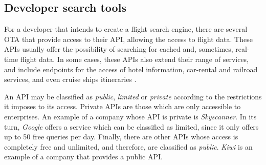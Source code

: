 \subsection{Developer search tools}
\label{sec:developer_st}


For a developer that intends to create a flight search engine, there are several OTA that provide access to their API, allowing the access to flight data. These APIs usually offer the possibility of searching for cached and, sometimes, real-time flight data. In some cases, these APIs also extend their range of services, and include endpoints for the access of hotel information, car-rental and railroad services, and even cruise ships itineraries  \cite{expedia_docs, amadeus}.

An API may be classified as \textit{public}, \textit{limited} or \textit{private} according to the restrictions it imposes to its access. Private APIs are those which are only accessible to enterprises. An example of a company whose API is private is \textit{Skyscanner}. In its turn, \textit{Google} offers a service which can be classified as limited, since it only offers up to 50 free queries per day. Finally, there are other APIs whose access is completely free and unlimited, and therefore, are classified as \textit{public}. \textit{Kiwi} is an example of a company that provides a public API.





